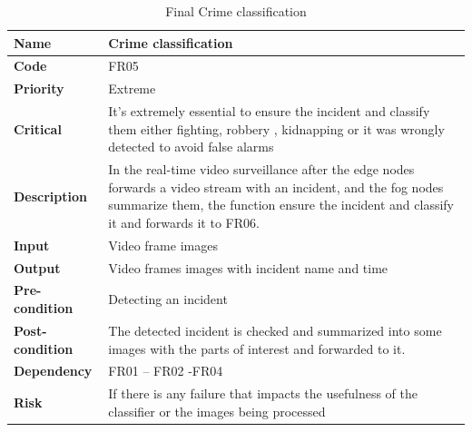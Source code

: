 \documentclass[12pt]{article}
\begin{document}
\begin{table}[h!]
\caption{Final Crime classification}

\begin{tabular}{|p{}|p{}|}
\hline
\textbf{Name}           &   Crime classification \\ \hline
\textbf{Code}           & FR05 \\ \hline
\textbf{Priority}       & Extreme \\ \hline
\textbf{Critical}       & It's extremely essential to ensure the incident and classify them either fighting, robbery , kidnapping or it was wrongly detected to avoid false alarms \\ \hline
\textbf{Description}    & In the real-time video surveillance after the edge nodes forwards a video stream with an incident, and the fog nodes summarize them, the function ensure the incident and classify it and forwards it to FR06.\\ \hline
\textbf{Input}          & Video frame images                       \\ \hline
\textbf{Output}         & Video frames images with incident name and time    \\ \hline
\textbf{Pre-condition}  & Detecting an incident            \\ \hline
\textbf{Post-condition} &The detected incident is checked and summarized into some images with the parts of interest and forwarded to it. \\ \hline
\textbf{Dependency}     & FR01 – FR02 -FR04                                     \\ \hline
\textbf{Risk}           & If there is any failure that impacts the usefulness of the classifier or the images being processed \\ \hline
\end{tabular}
\end{table} 

\FloatBarrier
 
\end{document}
